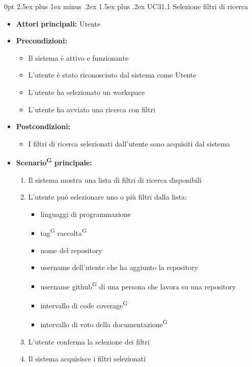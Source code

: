 \documentclass[a4paper, 11pt]{article}
\makeatletter
\renewcommand\paragraph{\@startsection{paragraph}{4}
  {0pt}
  {2.5ex plus 1ex minus .2ex}
  {1.5ex plus .2ex}
  {\normalfont\normalsize\bfseries\color{AccentDark}}}
\makeatother
\begin{document}
\paragraph{UC31.1 Selezione filtri di ricerca} \label{UC31.1}
\begin{itemize}
	\item \textbf{Attori principali:} Utente
	\item \textbf{Precondizioni:}
	\begin{itemize}
		\item Il sistema è attivo e funzionante
		\item L'utente è stato riconosciuto dal sistema come Utente
		\item L'utente ha selezionato un workspace
		\item L'utente ha avviato una ricerca con filtri
	\end{itemize}
	\item \textbf{Postcondizioni:}
	\begin{itemize}
		\item I filtri di ricerca selezionati dall'utente sono acquisiti dal sistema
	\end{itemize}
	\item \textbf{Scenario\textsuperscript{G} principale:}
	\begin{enumerate}
		\item Il sistema mostra una lista di filtri di ricerca disponibili
		\item L'utente può selezionare uno o più filtri dalla lista:
		\begin{itemize}
			\item linguaggi di programmazione
			\item tag\textsuperscript{G} raccolta\textsuperscript{G}
			\item nome del repository
			\item username dell'utente che ha aggiunto la repository
			\item username github\textsuperscript{G} di una persona che lavora su una repository
			\item intervallo di code coverage\textsuperscript{G}
			\item intervallo di voto della documentazione\textsuperscript{G}
		\end{itemize}
		\item L'utente conferma la selezione dei filtri
		\item Il sistema acquisisce i filtri selezionati
	\end{enumerate}

\end{itemize}
\end{document}
